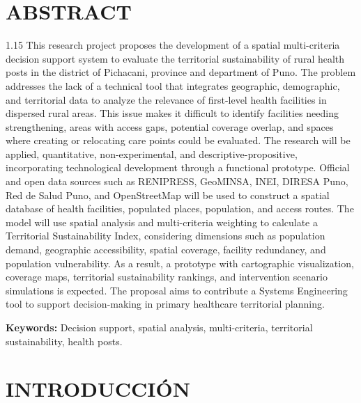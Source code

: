\documentclass[12pt,a4paper,oneside]{article}
\begin{document}
\newpage

\section*{ABSTRACT}
\begin{spacing}{1.15}
This research project proposes the development of a spatial multi-criteria decision support system to evaluate the territorial sustainability of rural health posts in the district of Pichacani, province and department of Puno. The problem addresses the lack of a technical tool that integrates geographic, demographic, and territorial data to analyze the relevance of first-level health facilities in dispersed rural areas. This issue makes it difficult to identify facilities needing strengthening, areas with access gaps, potential coverage overlap, and spaces where creating or relocating care points could be evaluated. The research will be applied, quantitative, non-experimental, and descriptive-propositive, incorporating technological development through a functional prototype. Official and open data sources such as RENIPRESS, GeoMINSA, INEI, DIRESA Puno, Red de Salud Puno, and OpenStreetMap will be used to construct a spatial database of health facilities, populated places, population, and access routes. The model will use spatial analysis and multi-criteria weighting to calculate a Territorial Sustainability Index, considering dimensions such as population demand, geographic accessibility, spatial coverage, facility redundancy, and population vulnerability. As a result, a prototype with cartographic visualization, coverage maps, territorial sustainability rankings, and intervention scenario simulations is expected. The proposal aims to contribute a Systems Engineering tool to support decision-making in primary healthcare territorial planning.
\end{spacing}

\vspace{0.5cm}
\noindent\textbf{Keywords:} Decision support, spatial analysis, multi-criteria, territorial sustainability, health posts.

\newpage
{}
\setcounter{page}{1}

\section{INTRODUCCIÓN}
\end{document}

